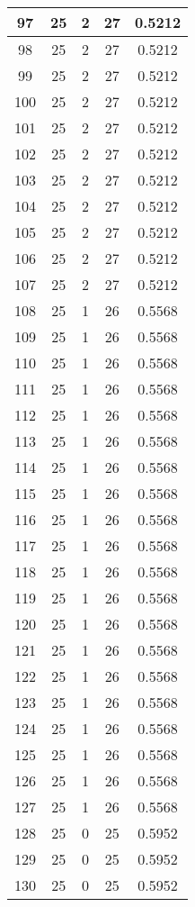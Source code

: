 \documentclass[letterpaper, 12pt]{article}
\begin{document}
\begin{longtable}{|c|c|c|c|c|}
\hline
97 & 25 & 2 & 27 & 0.5212 \\
\hline
98 & 25 & 2 & 27 & 0.5212 \\
\hline
99 & 25 & 2 & 27 & 0.5212 \\
\hline
100 & 25 & 2 & 27 & 0.5212 \\
\hline
101 & 25 & 2 & 27 & 0.5212 \\
\hline
102 & 25 & 2 & 27 & 0.5212 \\
\hline
103 & 25 & 2 & 27 & 0.5212 \\
\hline
104 & 25 & 2 & 27 & 0.5212 \\
\hline
105 & 25 & 2 & 27 & 0.5212 \\
\hline
106 & 25 & 2 & 27 & 0.5212 \\
\hline
107 & 25 & 2 & 27 & 0.5212 \\
\hline
108 & 25 & 1 & 26 & 0.5568 \\
\hline
109 & 25 & 1 & 26 & 0.5568 \\
\hline
110 & 25 & 1 & 26 & 0.5568 \\
\hline
111 & 25 & 1 & 26 & 0.5568 \\
\hline
112 & 25 & 1 & 26 & 0.5568 \\
\hline
113 & 25 & 1 & 26 & 0.5568 \\
\hline
114 & 25 & 1 & 26 & 0.5568 \\
\hline
115 & 25 & 1 & 26 & 0.5568 \\
\hline
116 & 25 & 1 & 26 & 0.5568 \\
\hline
117 & 25 & 1 & 26 & 0.5568 \\
\hline
118 & 25 & 1 & 26 & 0.5568 \\
\hline
119 & 25 & 1 & 26 & 0.5568 \\
\hline
120 & 25 & 1 & 26 & 0.5568 \\
\hline
121 & 25 & 1 & 26 & 0.5568 \\
\hline
122 & 25 & 1 & 26 & 0.5568 \\
\hline
123 & 25 & 1 & 26 & 0.5568 \\
\hline
124 & 25 & 1 & 26 & 0.5568 \\
\hline
125 & 25 & 1 & 26 & 0.5568 \\
\hline
126 & 25 & 1 & 26 & 0.5568 \\
\hline
127 & 25 & 1 & 26 & 0.5568 \\
\hline
128 & 25 & 0 & 25 & 0.5952 \\
\hline
129 & 25 & 0 & 25 & 0.5952 \\
\hline
130 & 25 & 0 & 25 & 0.5952 \\

\end{longtable}
\end{document}
